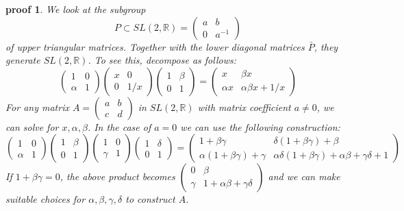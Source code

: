 \documentclass[
  12pt
]{article}
\theoremstyle{break}
\theoremstyle{plain}
\newtheorem*{pf}{proof}
\begin{document}
  \begin{pf}
    \label{ref:lem:pf:decomp}
    We look at the subgroup
    \[P \subset SL(2, \mathbb{R}) = \begin{pmatrix}a & b \\ 0 & a^{-1}\end{pmatrix}\]
    of upper triangular matrices. Together with the lower diagonal matrices
    $\bar{P}$, they generate $SL(2, \mathbb{R})$. To see this, decompose
    as follows: \[\begin{pmatrix}1&0\\\alpha&1\end{pmatrix}
    \begin{pmatrix}x&0\\0&1/x\end{pmatrix}
    \begin{pmatrix}1&\beta\\0&1\end{pmatrix} = 
    \begin{pmatrix} x&\beta x\\\alpha x& \alpha\beta x+1/x\end{pmatrix}\]
    For any matrix $A = \begin{pmatrix}a & b \\ c & d\end{pmatrix}$ in
    $SL(2, \mathbb{R})$ with matrix coefficient $a \neq 0$, we can solve
    for $x,\alpha, \beta$. In the case of $a = 0$ we can use the
    following construction:
    \[
      \begin{pmatrix} 1&0\\\alpha&1\end{pmatrix}
      \begin{pmatrix} 1&\beta\\0&1\end{pmatrix}
      \begin{pmatrix} 1&0\\\gamma&1\end{pmatrix}
      \begin{pmatrix} 1&\delta\\0&1\end{pmatrix}=
      \begin{pmatrix}
        1+\beta\gamma&\delta(1+\beta\gamma)+\beta\\
        \alpha(1+\beta\gamma)+\gamma&\alpha\delta(1+\beta\gamma)+\alpha\beta+\gamma\delta+1
      \end{pmatrix}
    \]
    If $1 + \beta\gamma = 0$, the above product becomes
    $\begin{pmatrix} 0&\beta\\ \gamma& 1+\alpha\beta+\gamma\delta \end{pmatrix}$
    and we can make suitable choices for $\alpha, \beta, \gamma, \delta$
    to construct $A$.


\end{pf}
\end{document}
